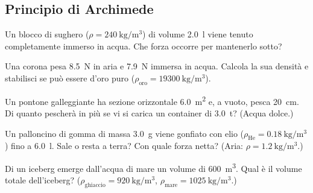 \subsection*{Principio di Archimede}

\begin{esercizio}
Un blocco di sughero ($\rho = \SI{240}{\kilo\gram\per\metre\cubed}$) di volume \SI{2,0}{\litre} viene tenuto completamente immerso in acqua. Che forza occorre per mantenerlo sotto?\\
\end{esercizio}

\begin{esercizio}
Una corona pesa \SI{8,5}{\newton} in aria e \SI{7,9}{\newton} immersa in acqua. Calcola la sua densità e stabilisci se può essere d'oro puro ($\rho_\text{oro} = \SI{19300}{\kilo\gram\per\metre\cubed}$).\\
\end{esercizio}

\begin{esercizio}
Un pontone galleggiante ha sezione orizzontale \SI{6,0}{\metre\squared} e, a vuoto, pesca \SI{20}{\centi\metre}. Di quanto pescherà in più se vi si carica un container di \SI{3,0}{\tonne}? (Acqua dolce.)\\
\end{esercizio}

\begin{esercizio}
Un palloncino di gomma di massa \SI{3,0}{\gram} viene gonfiato con elio ($\rho_\text{He} = \SI{0,18}{\kilo\gram\per\metre\cubed}$) fino a \SI{6,0}{\litre}. Sale o resta a terra? Con quale forza netta? (Aria: $\rho = \SI{1,2}{\kilo\gram\per\metre\cubed}$.)\\
\end{esercizio}

\begin{esercizio}
Di un iceberg emerge dall'acqua di mare un volume di \SI{600}{\metre\cubed}. Qual è il volume totale dell'iceberg? ($\rho_\text{ghiaccio} = \SI{920}{\kilo\gram\per\metre\cubed}$, $\rho_\text{mare} = \SI{1025}{\kilo\gram\per\metre\cubed}$.)\\
\end{esercizio}
